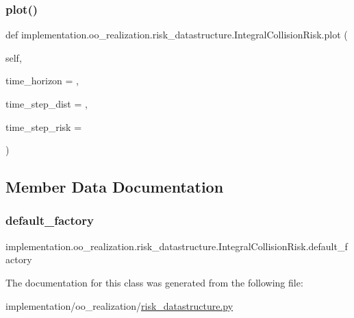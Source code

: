 \subsubsection{\texorpdfstring{plot()}{plot()}}
{\footnotesize\ttfamily def implementation.\+oo\+\_\+realization.\+risk\+\_\+datastructure.\+Integral\+Collision\+Risk.\+plot (\begin{DoxyParamCaption}\item[{}]{self,  }\item[{}]{time\+\_\+horizon = {},  }\item[{}]{time\+\_\+step\+\_\+dist = {},  }\item[{}]{time\+\_\+step\+\_\+risk = {} }\end{DoxyParamCaption})}



\subsection{Member Data Documentation}
\mbox{\label{classimplementation_1_1oo__realization_1_1risk__datastructure_1_1_integral_collision_risk_a6617cfe3db631d60b3262a602bd401c6}} 
\subsubsection{\texorpdfstring{default\+\_\+factory}{default\_factory}}
{\footnotesize\ttfamily implementation.\+oo\+\_\+realization.\+risk\+\_\+datastructure.\+Integral\+Collision\+Risk.\+default\+\_\+factory\hspace{0.3cm}{\ttfamily [static]}}



The documentation for this class was generated from the following file\+:\begin{DoxyCompactItemize}
\item 
implementation/oo\+\_\+realization/\hyperlink{risk__datastructure_8py}{risk\+\_\+datastructure.\+py}\end{DoxyCompactItemize}
